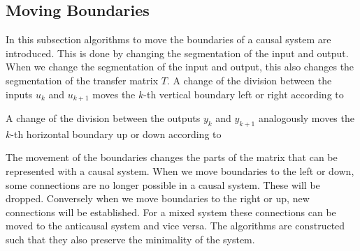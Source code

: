\documentclass[doctype=mastersthesis,BCOR=15mm,biblatex]{ldvbook}%
\newcommand{\m}{\triangledown} %
\begin{document}
\subsection{Moving Boundaries}\label{subsec:move}
In this subsection algorithms to move the boundaries of a causal system are introduced.
This is done by changing the segmentation of the input and output.
When we change the segmentation of the input and output, this also changes the segmentation of the transfer matrix $T$.
A change of the division between the inputs $u_k$ and $u_{k+1}$ moves the $k$-th vertical boundary left or right according to

A change of the division between the outputs $y_k$ and $y_{k+1}$ analogously moves the $k$-th horizontal boundary up or down according to

The movement of the boundaries changes the parts of the matrix that can be represented with a causal system.
When we move boundaries to the left or down, some connections are no longer possible in a causal system. These will be dropped.
Conversely when we move boundaries to the right or up, new connections will be established.
For a mixed system these connections can be moved to the anticausal system and vice versa.
The algorithms are constructed such that they also preserve the minimality of the system.%
\end{document}
